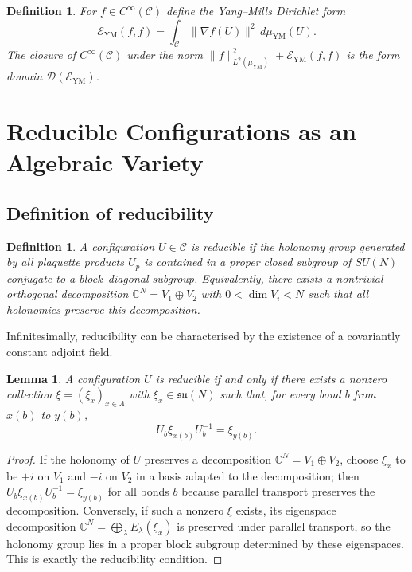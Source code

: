 \documentclass[11pt]{article}
\newtheorem{lemma}[theorem]{Lemma}
\newtheorem{definition}[theorem]{Definition}
\begin{document}
\begin{definition}
For $f\in C^\infty(\mathcal{C})$ define the Yang--Mills Dirichlet form
\begin{equation}
  \mathcal{E}_{\mathrm{YM}}(f,f)
  = \int_{\mathcal{C}} \|\nabla f(U)\|^2\,d\mu_{\mathrm{YM}}(U).
\end{equation}
The closure of $C^\infty(\mathcal{C})$ under the norm
$\|f\|_{L^2(\mu_{\mathrm{YM}})}^2+\mathcal{E}_{\mathrm{YM}}(f,f)$ is the
form domain $\mathcal{D}(\mathcal{E}_{\mathrm{YM}})$.
\end{definition}

\section{Reducible Configurations as an Algebraic Variety}

\subsection{Definition of reducibility}

\begin{definition}
A configuration $U\in\mathcal{C}$ is \emph{reducible} if the holonomy
group generated by all plaquette products $U_p$ is contained in a proper
closed subgroup of $SU(N)$ conjugate to a block--diagonal subgroup.
Equivalently, there exists a nontrivial orthogonal decomposition
$\mathbb{C}^N = V_1\oplus V_2$ with $0<\dim V_i<N$ such that all
holonomies preserve this decomposition.
\end{definition}

Infinitesimally, reducibility can be characterised by the existence of a
covariantly constant adjoint field.

\begin{lemma}
A configuration $U$ is reducible if and only if there exists a nonzero
collection $\xi=(\xi_x)_{x\in\Lambda}$ with $\xi_x\in\mathfrak{su}(N)$
such that, for every bond $b$ from $x(b)$ to $y(b)$,
\begin{equation}
  U_b\xi_{x(b)}U_b^{-1} = \xi_{y(b)}.
\end{equation}
\end{lemma}

\begin{proof}
If the holonomy of $U$ preserves a decomposition
$\mathbb{C}^N=V_1\oplus V_2$, choose $\xi_x$ to be $+i$ on $V_1$ and
$-i$ on $V_2$ in a basis adapted to the decomposition; then
$U_b\xi_{x(b)}U_b^{-1}=\xi_{y(b)}$ for all bonds $b$ because parallel
transport preserves the decomposition.  Conversely, if such a nonzero
$\xi$ exists, its eigenspace decomposition
$\mathbb{C}^N = \bigoplus_\lambda E_\lambda(\xi_x)$ is preserved under
parallel transport, so the holonomy group lies in a proper block
subgroup determined by these eigenspaces.  This is exactly the
reducibility condition.
\end{proof}
\end{document}
